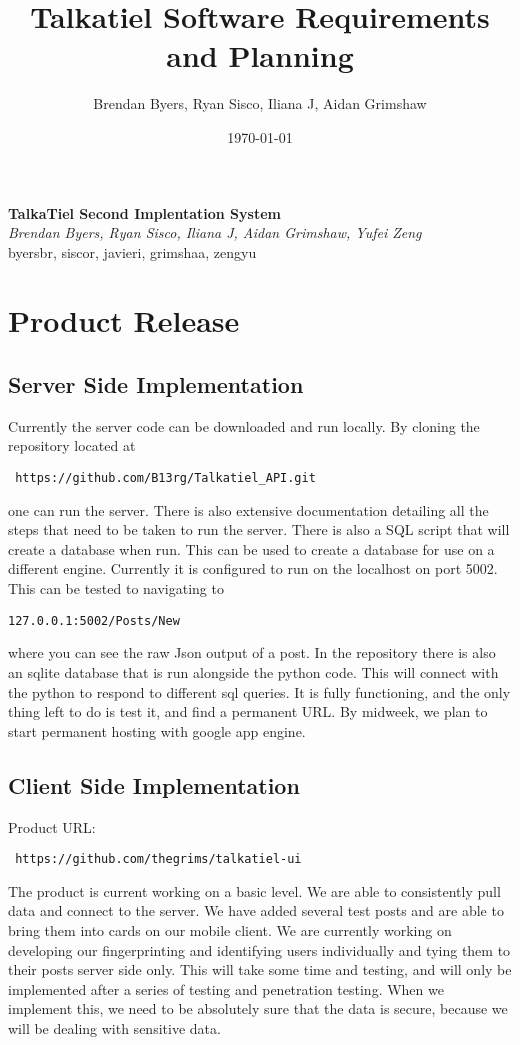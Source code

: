 \documentclass[12pt]{article}
\title{Talkatiel Software Requirements and Planning}
\author{Brendan Byers, Ryan Sisco, Iliana J, Aidan Grimshaw}
\date{\today}
\begin{document}
\begin{center}
      \Large\textbf{TalkaTiel Second Implentation System}\\
      \large\textit{Brendan Byers, Ryan Sisco, Iliana J, Aidan Grimshaw, Yufei Zeng}\\
      \large{byersbr, siscor, javieri, grimshaa, zengyu}\\
   \end{center}

\tableofcontents
\section{Product Release} \subsection{Server Side Implementation} Currently the
server code can be downloaded and run locally.  By cloning the repository
located at\begin{verbatim} https://github.com/B13rg/Talkatiel_API.git
\end{verbatim}one can run the server.  There is also extensive documentation
detailing all the steps that need to be taken to run the server.  There is also
a SQL script that will create a database when run.  This can be used to create a
database for use on a different engine.  Currently it is configured to run on
the localhost on port 5002.  This can be tested to navigating to
\begin{verbatim}127.0.0.1:5002/Posts/New \end{verbatim}where you can see the raw
Json output of a post.  In the repository there is also an sqlite database that
is run alongside the python code.  This will connect with the python to respond
to different sql queries.  It is fully functioning, and the only thing left to
do is test it, and find a permanent URL. By midweek, we plan to start permanent
hosting with google app engine.

\subsection {Client Side Implementation}
Product URL:\begin{verbatim} https://github.com/thegrims/talkatiel-ui \end{verbatim}
The product is current working on a basic level. We are able to consistently pull data and connect to the server. We have added several test posts and are able to bring them into cards on our mobile client. We are currently working on developing our fingerprinting and identifying users individually and tying them to their posts server side only. This will take some time and testing, and will only be implemented after a series of testing and penetration testing. When we implement this, we need to be absolutely sure that the data is secure, because we will be dealing with sensitive data. 
\end{document}
